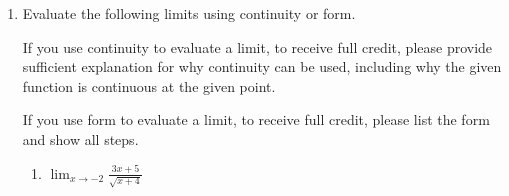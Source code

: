 \documentclass[11pt]{article}
\begin{document}
\begin{enumerate}
\begin{enumerate}
\item On the interval $[-3, 4]$, at what $a$-value(s) is $f(x)$ NOT continuous at $x=a$? For each point where there is a discontinuity, determine its type and explain why it belongs to that type.
\textcolor{blue}{\textbf{Solution:} On the interval $[-3,4]$, $f(x)$ is not continuous at $x = -2$, which is a removable discontinuity. So the function value is not equal to the limit (i.e. even though the function is defined at $x = -2$ and $ \displaystyle \lim_{x \to -2} f(x)$ exists, $\displaystyle \lim_{x \to-2} f(x) \neq f(-2)$). It is also the case that $f(x)$ is not continuous at $x = 2$, which is an infinite discontinuity. Here, $f(2)$ is not defined, $\displaystyle \lim_{x \to 2}f(x)$ does not exist  (again, it increases without bound from either side so cannot be a finite number) and $\displaystyle \lim_{x \to2} f(x) \neq f(2)$).}
 

\end{enumerate}


\newpage


\item Evaluate the following limits using continuity or form.

If you use continuity to evaluate a limit, to receive full credit, please provide sufficient explanation for why continuity can be used, including why the given function is continuous at the given point.

If you use form to evaluate a limit, to receive full credit, please list the form and show all steps. 

\begin{enumerate}
    \item \(\displaystyle \lim_{x\to -2}\frac{3x+5}{\sqrt{x+4}}\)

    \vspace{4pt}


\end{enumerate}
\end{enumerate}
\end{document}
